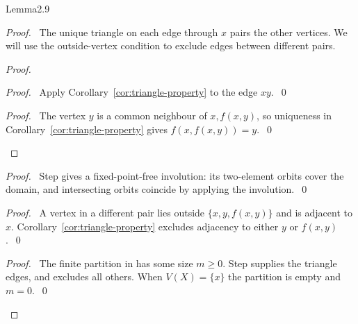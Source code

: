 \begin{cgss}{Lemma}{2.9}\label{lem:2.9}
\end{cgss}
\begin{proof}
 \pfsketch\ The unique triangle on each edge through $x$ pairs the other vertices.
 We will use the outside-vertex condition to exclude edges between different pairs.
 \begin{proof}
  \begin{proof}\pf\ Apply Corollary~\ref{cor:triangle-property} to the edge $xy$.~\qed\end{proof}
  \qedstep
  \begin{proof}
   \pf\ The vertex $y$ is a common neighbour of $x,f(x,y)$, so uniqueness in
   Corollary~\ref{cor:triangle-property} gives $f(x,f(x,y))=y$.~\qed
  \end{proof}
 \end{proof}
 \begin{proof}
  \pf\ Step  gives a fixed-point-free involution: its two-element
  orbits cover the domain, and intersecting orbits coincide by applying the involution.~\qed
 \end{proof}
 \begin{proof}
  \pf\ A vertex in a different pair lies outside $\{x,y,f(x,y)\}$ and is adjacent to $x$.
  Corollary~\ref{cor:triangle-property} excludes adjacency to either $y$ or $f(x,y)$.~\qed
 \end{proof}
 \qedstep
 \begin{proof}
  \pf\ The finite partition in  has some size $m\geq0$.
  Step  supplies the triangle edges, and  excludes all others.
  When $V(X)=\{x\}$ the partition is empty and $m=0$.~\qed
 \end{proof}
\end{proof}

